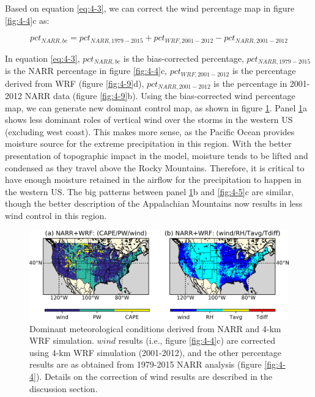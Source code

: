 Based on equation \ref{eq:4-3}, we can correct the wind percentage map in figure \ref{fig:4-4}c as:

\begin{equation}
pc{t_{NARR,bc}} = pc{t_{NARR,1979 - 2015}} + pc{t_{WRF,2001 - 2012}} - pc{t_{NARR,2001 - 2012}}
\label{eq:4-3}
\end{equation}


In equation \ref{eq:4-3}, $pc{t_{NARR,bc}}$ is the bias-corrected percentage, $pc{t_{NARR,1979 - 2015}}$ is the NARR percentage in figure \ref{fig:4-4}c, $pc{t_{WRF,2001 - 2012}}$ is the percentage derived from WRF (figure \ref{fig:4-9}d), $pc{t_{NARR,2001 - 2012}}$ is the percentage in 2001-2012 NARR data (figure \ref{fig:4-9}b). Using the bias-corrected wind percentage map, we can generate new dominant control map, as shown in figure \ref{fig:4-10}. Panel \ref{fig:4-10}a shows less dominant roles of vertical wind over the storms in the western US (excluding west coast). This makes more sense, as the Pacific Ocean provides moisture source for the extreme precipitation in this region. With the better presentation of topographic impact in the model, moisture tends to be lifted and condensed as they travel above the Rocky Mountains. Therefore, it is critical to have enough moisture retained in the airflow for the precipitation to happen in the western US. The big patterns between panel \ref{fig:4-10}b and \ref{fig:4-5}c are similar, though the better description of the Appalachian Mountains now results in less wind control in this region.

\begin{figure}[htbp]
	\includegraphics[width=\linewidth]{pics/ch4/fig10.png}
	\caption{Dominant meteorological conditions derived from NARR and 4-km WRF simulation. $wind$ results (i.e., figure \ref{fig:4-4}c) are corrected using 4-km WRF simulation (2001-2012), and the other percentage results are as obtained from 1979-2015 NARR analysis (figure \ref{fig:4-4}). Details on the correction of wind results are described in the discussion section.}
	\label{fig:4-10}
\end{figure}

